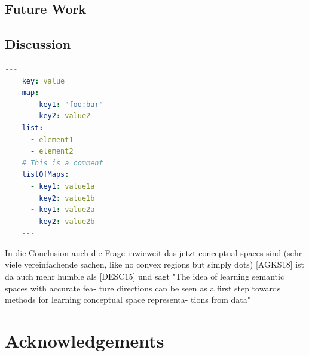 \documentclass[11pt,
  paper=a4, 
  hidelinks,
  bibliography=totocnumbered,
	captions=tableheading,
	BCOR=10mm
]{scrreprt}
\theoremstyle{definition}
\begin{document}
\section{Future Work}




\section{Discussion}


\begin{lstlisting}[language=yaml]
    ---
    key: value
    map:
        key1: "foo:bar"
        key2: value2
    list:
      - element1
      - element2
    # This is a comment
    listOfMaps:
      - key1: value1a
        key2: value1b
      - key1: value2a
        key2: value2b
    ---
\end{lstlisting}

In die Conclusion auch die Frage inwieweit das jetzt conceptual spaces sind (sehr viele vereinfachende sachen, like no convex regions but simply dots)
[AGKS18] ist da auch mehr humble als [DESC15] und sagt "The idea of learning semantic spaces with accurate fea- ture directions can be seen as a first step towards methods for learning conceptual space representa- tions from data"


\chapter*{Acknowledgements}



\glsaddall
\printglossaries %

	
	\appendix %
	
	
	
	


\printbibliography[heading=bibintoc]
\end{document}
